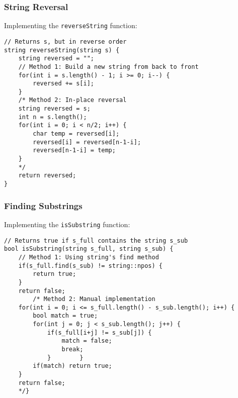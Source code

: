 \documentclass{beamer}
\begin{document}
\begin{frame}[fragile]
    \frametitle{String Reversal}
    
    Implementing the \texttt{reverseString} function:
    
    \begin{lstlisting}
// Returns s, but in reverse order
string reverseString(string s) {
    string reversed = "";    
    // Method 1: Build a new string from back to front
    for(int i = s.length() - 1; i >= 0; i--) {
        reversed += s[i];
    }    
    /* Method 2: In-place reversal
    string reversed = s;
    int n = s.length();
    for(int i = 0; i < n/2; i++) {
        char temp = reversed[i];
        reversed[i] = reversed[n-1-i];
        reversed[n-1-i] = temp;
    }
    */    
    return reversed;
}
    \end{lstlisting}
\end{frame}

\begin{frame}[fragile]
    \frametitle{Finding Substrings}
    
    Implementing the \texttt{isSubstring} function:
    
    \begin{lstlisting}
// Returns true if s_full contains the string s_sub
bool isSubstring(string s_full, string s_sub) {
    // Method 1: Using string's find method
    if(s_full.find(s_sub) != string::npos) {
        return true;
    }
    return false;
        /* Method 2: Manual implementation
    for(int i = 0; i <= s_full.length() - s_sub.length(); i++) {
        bool match = true;
        for(int j = 0; j < s_sub.length(); j++) {
            if(s_full[i+j] != s_sub[j]) {
                match = false;
                break;
            }        }
        if(match) return true;
    }
    return false;
    */}
    \end{lstlisting}
\end{frame}
\end{document}
